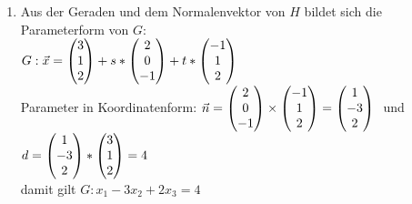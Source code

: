 \begin{lsg}{}
\begin{enumerate}
		\item Aus der Geraden und dem Normalenvektor von $H$ bildet sich die Parameterform von $G$: \\$G: \vec{x}=\begin{pmatrix} 3\\1\\2 \end{pmatrix}+s*\begin{pmatrix} 2\\0\\-1 \end{pmatrix}+t*\begin{pmatrix} -1\\1\\2 \end{pmatrix}$\\
		Parameter in Koordinatenform:
		$\vec{n}=\begin{pmatrix} 2\\0\\-1 \end{pmatrix}\times \begin{pmatrix} -1\\1\\2 \end{pmatrix}=\begin{pmatrix} 1\\-3\\2 \end{pmatrix}\ $ und $d=\begin{pmatrix} 1\\-3\\2 \end{pmatrix}*\begin{pmatrix} 3\\1\\2 \end{pmatrix}=4$\\
		damit gilt $G:x_1-3x_2+2x_3=4$ 
	\end{enumerate}
\end{lsg}




